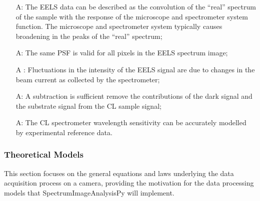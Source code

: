 \documentclass[12pt]{article}
\newcounter{assumpnum} %
\newcommand{\progname}{SpectrumImageAnalysisPy} %
\begin{document}
\begin{itemize}

	\item[A\refstepcounter{assumpnum}\theassumpnum \label{EELS_System_Response}:]
The EELS data can be described as the convolution of the ``real'' spectrum of
the sample with the response of the microscope and spectrometer system function.
The microscope and spectrometer system typically causes broadening in the peaks
of the ``real'' spectrum;
	
	\item[A\refstepcounter{assumpnum}\theassumpnum \label{EELS_PSF_variability}:]
The same PSF is valid for all pixels in the EELS spectrum image;
	
	\item[A\refstepcounter{assumpnum}\theassumpnum
\label{EELS_Intensity_Fluctuations}:] Fluctuations in the intensity of the EELS
signal are due to changes in the beam current as collected by the spectrometer;
	
	\item[A\refstepcounter{assumpnum}\theassumpnum \label{CL_Background}:] A
subtraction is sufficient remove the contributions of the dark signal and the
substrate signal from the CL sample signal;
	
	\item[A\refstepcounter{assumpnum}\theassumpnum \label{CL_System_Response}:] The
CL spectrometer wavelength sensitivity can be accurately modelled by
experimental reference data.

\end{itemize}

\subsubsection{Theoretical Models}\label{sec_theoretical}

This section focuses on the general equations and laws underlying the data
acquisition process on a camera, providing the motivation for the data
processing models that \progname{} will implement.

~\newline
\end{document}
